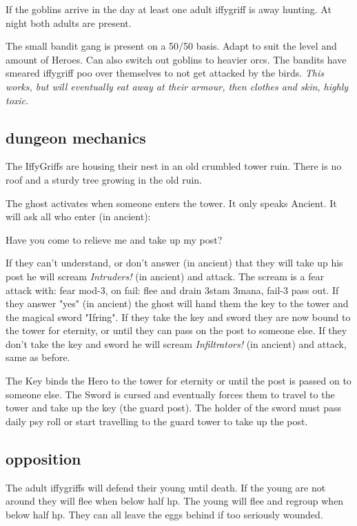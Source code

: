 If the goblins arrive in the day at least one adult iffygriff is away hunting. At night both adults are present.

The small bandit gang is present on a 50/50 basis. Adapt to suit the level and amount of Heroes. Can also switch out goblins to heavier orcs. The bandits have smeared iffygriff poo over themselves to not get attacked by the birds. \emph{This works, but will eventually eat away at their armour, then clothes and skin, highly toxic.}


\subsection*{dungeon mechanics}

The IffyGriffs are housing their nest in an old crumbled tower ruin. There is no roof and a sturdy tree growing in the old ruin.

The ghost activates when someone enters the tower. It only speaks Ancient. It will ask all who enter (in ancient):
\begin{readoutloud}
 Have you come to relieve me and take up my post?
\end{readoutloud}
If they can't understand, or don't answer (in ancient) that they will take up his post he will scream \emph{Intruders!} (in ancient) and attack. The scream is a fear attack with: fear mod-3, on fail: flee and drain 3stam 3mana, fail-3 pass out.
If they answer "yes" (in ancient) the ghost will hand them the key to the tower and the magical sword "Ifring". If they take the key and sword they are now bound to the tower for eternity, or until they can pass on the post to someone else. If they don't take the key and sword he will scream \emph{Infiltrators!} (in ancient) and attack, same as before.

The Key binds the Hero to the tower for eternity or until the post is passed on to someone else. The Sword is cursed and eventually forces them to travel to the tower and take up the key (the guard post). The holder of the sword must pass daily psy roll or start travelling to the guard tower to take up the post.


\subsection*{opposition}

The adult iffygriffs will defend their young until death. If the young are not around they will flee when below half hp. The young will flee and regroup when below half hp. They can all leave the eggs behind if too seriously wounded.

